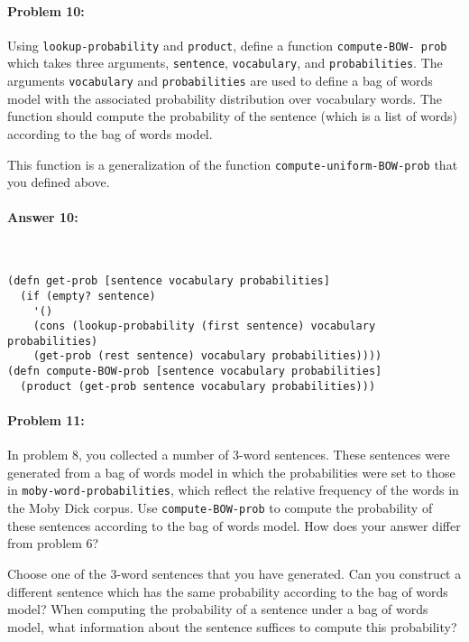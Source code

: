 \documentclass[12pt, letterpaper]{article}
\begin{document}
\hrulefill
\paragraph{Problem 10:}

Using \texttt{lookup-probability} and \texttt{product}, define a
function \texttt{compute-BOW- prob} which takes three arguments,
\texttt{sentence}, \texttt{vocabulary}, and
\texttt{probabilities}. The arguments \texttt{vocabulary} and
\texttt{probabilities} are used to define a bag of words model with
the associated probability distribution over vocabulary words. The
function should compute the probability of the sentence (which is a
list of words) according to the bag of words model.

This function is a generalization of the function
\texttt{compute-uniform-BOW-prob} that you defined above.

\paragraph{Answer 10:}~\begin{lstlisting}
(defn get-prob [sentence vocabulary probabilities]
  (if (empty? sentence)
    '()
    (cons (lookup-probability (first sentence) vocabulary probabilities)
    (get-prob (rest sentence) vocabulary probabilities))))
(defn compute-BOW-prob [sentence vocabulary probabilities]
  (product (get-prob sentence vocabulary probabilities)))
\end{lstlisting}

\hrulefill
\paragraph{Problem 11:}

In problem 8, you collected a number of 3-word sentences. These
sentences were generated from a bag of words model in which the
probabilities were set to those in \texttt{moby-word-probabilities},
which reflect the relative frequency of the words in the Moby Dick
corpus. Use \texttt{compute-BOW-prob} to compute the probability of
these sentences according to the bag of words model. How does your
answer differ from problem 6?

Choose one of the 3-word sentences that you have generated. Can you
construct a different sentence which has the same probability
according to the bag of words model? When computing the probability of
a sentence under a bag of words model, what information about the
sentence suffices to compute this probability?
\end{document}
